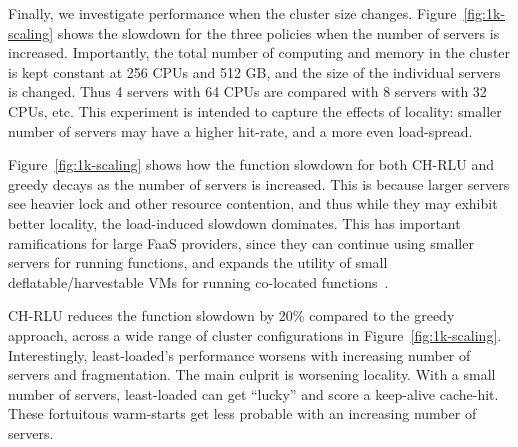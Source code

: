 Finally, we investigate performance when the cluster size changes.
Figure~\ref{fig:1k-scaling} shows the slowdown for the three policies when the number of servers is increased.
Importantly, the total number of computing and memory in the cluster is kept constant at 256 CPUs and 512 GB, and the size of the individual servers is changed.
Thus 4 servers with 64 CPUs are compared with 8 servers with 32 CPUs, etc.
This experiment is intended to capture the effects of locality: smaller number of servers may have a higher hit-rate, and a more even load-spread.

Figure~\ref{fig:1k-scaling} shows how the function slowdown for both CH-RLU and greedy decays as the number of servers is increased.  
This is because larger servers see heavier lock and other resource contention, and thus while they may exhibit better locality, the load-induced slowdown dominates.
This has important ramifications for large FaaS providers, since they can continue using smaller servers for running functions, and expands the utility of small deflatable/harvestable VMs for running co-located functions~\cite{serverless-harvest-sosp21}.

CH-RLU reduces the function slowdown by 20\% compared to the greedy approach, across a wide range of cluster configurations in Figure~\ref{fig:1k-scaling}. 
Interestingly, least-loaded's performance worsens with increasing number of servers and fragmentation.
The main culprit is worsening locality.
With a small number of servers, least-loaded can get ``lucky'' and score a keep-alive cache-hit.
These fortuitous warm-starts get less probable with an increasing number of servers. 


